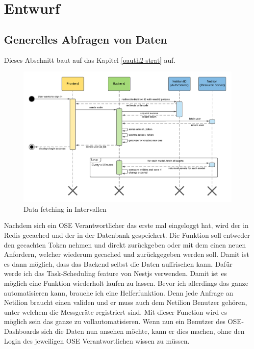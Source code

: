 
\chapter{Entwurf}
\section{Generelles Abfragen von Daten} \label{data-fetching}
Dieses Abschnitt baut auf das Kapitel \ref{oauth2-strat} auf.
\begin{figure}[!ht]
  \centering
  \includegraphics[width=.95\linewidth]{./images/datafetching.png}
  \caption[{Sequenzdiagram, welches das automatische fetching Erklärt}]{Data fetching in Intervallen}
  \label{fig:data-fetching}
\end{figure}
Nachdem sich ein OSE Verantwortlicher das erste mal eingeloggt hat, wird der  in Redis gecached und der  in der Datenbank gespeichert. Die Funktion soll entweder den gecachten Token nehmen und direkt zurückgeben oder mit dem  einen neuen Anfordern, welcher wiederum gecached und zurückgegeben werden soll. Damit ist es dann möglich, dass das Backend selbst die Daten auffrischen kann. Dafür werde ich das Task-Scheduling\cite{a2021_documentation} feature von Nestjs verwenden. Damit ist es möglich eine Funktion wiederholt laufen zu lassen.
\newline
Bevor ich allerdings das ganze automatisieren kann, brauche ich eine Helferfunktion. Denn jede Anfrage an Netilion braucht einen validen  und er muss auch dem Netilion Benutzer gehören, unter welchem die Messgeräte registriert sind. Mit dieser Function wird es möglich sein das ganze zu vollautomatisieren. Wenn nun ein Benutzer des OSE-Dashboards sich die Daten nun ansehen möchte, kann er dies machen, ohne den Login des jeweiligen OSE Verantwortlichen wissen zu müssen.
\pagebreak
